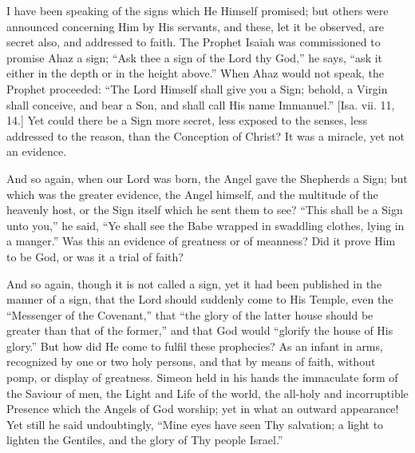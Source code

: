 I have been speaking of the signs which He Himself promised; but
others were announced concerning Him by His servants, and these, let it
be observed, are secret also, and addressed to faith. The Prophet Isaiah
was commissioned to promise Ahaz a sign; ``Ask thee a sign of the
Lord thy God,'' he says, ``ask it either in the depth or in the
height above.'' When Ahaz would not speak, the Prophet proceeded:
``The Lord Himself shall give you a Sign; behold, a Virgin shall
conceive, and bear a Son, and shall call His name Immanuel.'' [Isa.
vii. 11, 14.] Yet could there be a Sign more secret, less exposed to the
senses, less addressed to the reason, than the Conception of Christ? It
was a miracle, yet not an evidence.

And so again, when our Lord was born, the Angel gave the Shepherds a
Sign; but which was the greater evidence, the Angel himself, and the
multitude of the heavenly host, or the Sign itself which he sent them to
see? ``This shall be a Sign unto you,'' he said, ``Ye shall
see the Babe wrapped in swaddling clothes, lying in a manger.'' Was
this an evidence of greatness or of meanness? Did it prove Him to be
God, or was it a trial of faith?

And so again, though it is not called a sign, yet it had been
published in the manner of a sign, that the Lord should suddenly come to
His Temple, even the ``Messenger of the Covenant,'' that
``the glory of the latter house should be greater than that of the
former,'' and that God would ``glorify the house of His
glory.'' But how did He come to fulfil these prophecies? As an
infant in arms, recognized by one or two holy persons, and that by means
of faith, without pomp, or display of greatness. Simeon held in his
hands the immaculate form of the Saviour of men, the Light and Life of
the world, the all-holy and incorruptible Presence which the Angels of
God worship; yet in what an outward appearance! Yet still he said
undoubtingly, ``Mine eyes have seen Thy salvation; a light to
lighten the Gentiles, and the glory of Thy people Israel.''

